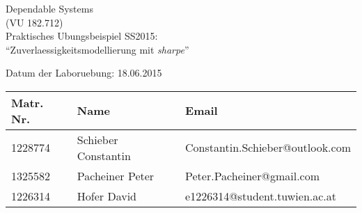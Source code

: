 \begin{titlepage}

\begin{center}
\vspace*{1.3cm}
{\Huge Dependable Systems\\(VU 182.712)\\}
\vspace{1.7cm}
{\LARGE Praktisches Ubungsbeispiel SS2015:\\``Zuverlaessigkeitsmodellierung mit \textit{sharpe}''\\}
\vspace{1.7cm}


{\hspace{1cm} Datum der Laboruebung: 18.06.2015}


\begin{table}[h!]
\centering
\begin{tabular}{|p{3.5cm}|p{4cm}|p{6.5cm}|}
\hline \textbf{Matr. Nr.} & \textbf{Name} & \textbf{Email}\\
\hline
1228774 &  Schieber Constantin & Constantin.Schieber@outlook.com\\
\hline
1325582 &  Pacheiner Peter & Peter.Pacheiner@gmail.com \\
\hline
1226314 & Hofer David & e1226314@student.tuwien.ac.at \\
\hline
\end{tabular}
\end{table}

\end{center}
\vspace{1.0cm}

\end{titlepage}
\setcounter{page}{2}




